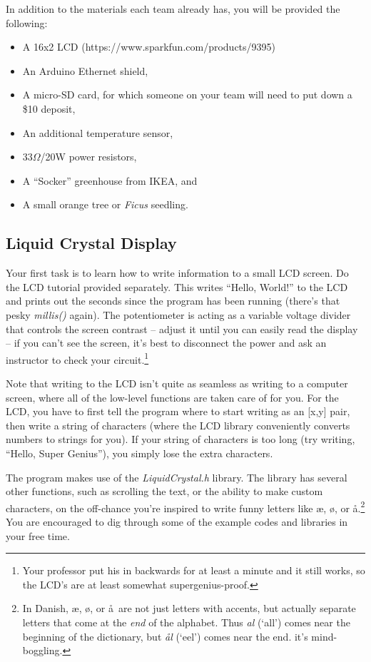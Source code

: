 \documentclass[11pt]{article} %
\begin{document}
In addition to the materials each team already has, you will be provided the following:
\begin{itemize}
\item A 16x2 LCD (https://www.sparkfun.com/products/9395)
\item An Arduino Ethernet shield,
\item A micro-SD card, for which someone on your team will need to put down a \$10 deposit,
\item An additional temperature sensor,
\item 33$\Omega$/20W power resistors,
\item A ``Socker'' greenhouse from IKEA, and
\item A small orange tree or \emph{Ficus} seedling.
\end{itemize}

\subsection{Liquid Crystal Display}

Your first task is to learn how to write information to a small LCD screen. Do the LCD tutorial provided separately. This writes ``Hello, World!'' to the LCD and prints out the seconds since the program has been running (there's that pesky \emph{millis()} again). The potentiometer is acting as a variable voltage divider that controls the screen contrast -- adjust it until you can easily read the display -- if you can't see the screen, it's best to disconnect the power and ask an instructor to check your circuit.\footnote{Your professor put his in backwards for at least a minute and it still works, so the LCD's are at least somewhat supergenius-proof.}

Note that writing to the LCD isn't quite as seamless as writing to a computer screen, where all of the low-level functions are taken care of for you. For the LCD, you have to first tell the program where to start writing as an [x,y] pair, then write a string of characters (where the LCD library conveniently converts numbers to strings for you). If your string of characters is too long (try writing, ``Hello, Super Genius''), you simply lose the extra characters.

The program makes use of the \emph{LiquidCrystal.h} library. The library has several other functions, such as scrolling the text, or the ability to make custom characters, on the off-chance you're inspired to write funny letters like \ae, \o, or \aa.\footnote{In Danish, \ae, \o, or \aa\ are not just letters with accents, but actually separate letters that come at the \emph{end} of the alphabet. Thus \emph{al} (`all') comes near the beginning of the dictionary, but \emph{\aa l} (`eel') comes near the end. it's mind-boggling.} You are encouraged to dig through some of the example codes and libraries in your free time.
\end{document}
